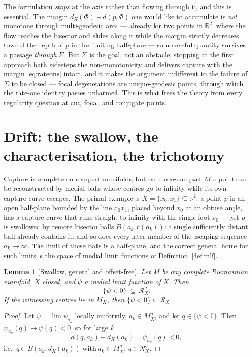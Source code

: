 \documentclass[11pt]{article}
\newtheorem{lemma}[theorem]{Lemma}
\theoremstyle{remark}
\newcommand{\R}{\mathbb{R}}
\newcommand{\X}{X}
\newcommand{\Mx}{M_{\X}}
\newcommand{\Mg}{M^{g}_{\X}}
\newcommand{\Rx}{\mathcal{R}_{\X}}
\newcommand{\Rg}{\mathcal{R}^{g}_{\X}}
\newcommand{\dX}{d_{\X}}
\begin{document}
The formulation \emph{stops} at the axis rather than flowing through
it, and this is essential. The margin $\dX(\Phi)-d(p,\Phi)$ one would
like to accumulate is \emph{not} monotone through multi-geodesic
arcs --- already for two points in $\R^{2}$, where the flow reaches
the bisector and slides along it while the margin strictly decreases
toward the depth of $p$ in the limiting half-plane --- so no useful
quantity survives a passage \emph{through} $\Sigma$. But $\Sigma$ is
the goal, not an obstacle: stopping at the first approach both
sidesteps the non-monotonicity and delivers capture with the margin
\eqref{eq:rateone} intact, and it makes the argument indifferent to
the failure of $\Sigma$ to be closed --- focal degenerations are
unique-geodesic points, through which the rate-one identity passes
unharmed. This is what frees the theory from every regularity
question at cut, focal, and conjugate points.

\section{Drift: the swallow, the characterisation, the trichotomy}
\label{sec:drift}

Capture is complete on compact manifolds, but on a non-compact $M$ a
point can be reconstructed by medial balls whose centres go to
infinity while its own capture curve escapes. The primal example is
$\X=\{x_{0},x_{1}\}\subseteq\R^{2}$: a point $p$ in an open half-plane
bounded by the line $x_{0}x_{1}$, placed beyond $x_{0}$ at an obtuse
angle, has a capture curve that runs straight to infinity with the
single foot $x_{0}$ --- yet $p$ is swallowed by remote bisector
balls $B(a_{k},r(a_{k}))$: a single sufficiently distant ball
already contains it, and so does every later member of the escaping
sequence $a_{k}\to\infty$. The limit of those balls is a
half-plane, and the correct general home for such limits is the space
of medial limit functions of Definition~\ref{def:mlf}.

\begin{lemma}[Swallow, general and offset-free]\label{lem:swallow}
Let $M$ be any complete Riemannian manifold, $\X$ closed, and $\psi$ a
medial limit function of $\X$. Then
\[
  \{\psi<0\}\ \subseteq\ \Rg .
\]
If the witnessing centres lie in $\Mx$, then $\{\psi<0\}\subseteq\Rx$.
\end{lemma}

\begin{proof}
Let $\psi=\lim\psi_{a_{k}}$ locally uniformly, $a_{k}\in\Mg$, and let
$q\in\{\psi<0\}$. Then $\psi_{a_{k}}(q)\to\psi(q)<0$, so for large $k$
\[
  d(q,a_{k})-\dX(a_{k})=\psi_{a_{k}}(q)<0,
\]
i.e.\ $q\in B(a_{k},\dX(a_{k}))$ with $a_{k}\in\Mg$: $q\in\Rg$.
\end{proof}
\end{document}
